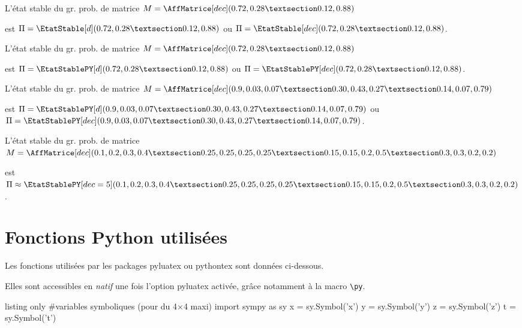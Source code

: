 \documentclass[french,a4paper,11pt]{article}
\begin{document}
\begin{PresentationCode}{}
L'état stable du gr. prob. de matrice
$M=\AffMatrice[dec](0.72,0.28 § 0.12,0.88)$

est $\Pi = \EtatStable[d](0.72,0.28 § 0.12,0.88)$
ou $\Pi = \EtatStable[dec](0.72,0.28 § 0.12,0.88)$.
\end{PresentationCode}

\begin{PresentationCode}{}
L'état stable du gr. prob. de matrice
$M=\AffMatrice[dec](0.72,0.28 § 0.12,0.88)$

est $\Pi = \EtatStablePY[d](0.72,0.28 § 0.12,0.88)$
ou $\Pi = \EtatStablePY[dec](0.72,0.28 § 0.12,0.88)$.
\end{PresentationCode}

\begin{PresentationCode}{}
L'état stable du gr. prob. de matrice
$M=\AffMatrice[dec](0.9,0.03,0.07 § 0.30,0.43,0.27 § 0.14,0.07,0.79)$

est $\Pi = \EtatStablePY[d](0.9,0.03,0.07 § 0.30,0.43,0.27 § 0.14,0.07,0.79)$
ou $\Pi = \EtatStablePY[dec](0.9,0.03,0.07 § 0.30,0.43,0.27 § 0.14,0.07,0.79)$.
\end{PresentationCode}

\begin{PresentationCode}{}
L'état stable du gr. prob. de matrice
$M=\AffMatrice[dec]%
	(0.1,0.2,0.3,0.4 § 0.25,0.25,0.25,0.25 § 0.15,0.15,0.2,0.5 § 0.3,0.3,0.2,0.2)$

est $\Pi \approx
\EtatStablePY[dec=5]%
(0.1,0.2,0.3,0.4 § 0.25,0.25,0.25,0.25 § 0.15,0.15,0.2,0.5 § 0.3,0.3,0.2,0.2)$.
\end{PresentationCode}


\pagebreak

\part{Fonctions Python utilisées}

\begin{cautionblock}
Les fonctions utilisées par les packages \textsf{pyluatex} ou \textsf{pythontex} sont données ci-dessous.

Elles sont accessibles en \textit{natif} une fois l'option \textsf{pyluatex} activée, grâce notamment à la macro \texttt{\textbackslash py}.
\end{cautionblock}

\begin{PresentationCodePython}{listing only}
#variables symboliques (pour du 4×4 maxi)
import sympy as sy
x = sy.Symbol('x')
y = sy.Symbol('y')
z = sy.Symbol('z')
t = sy.Symbol('t')
\end{PresentationCodePython}
\end{document}
